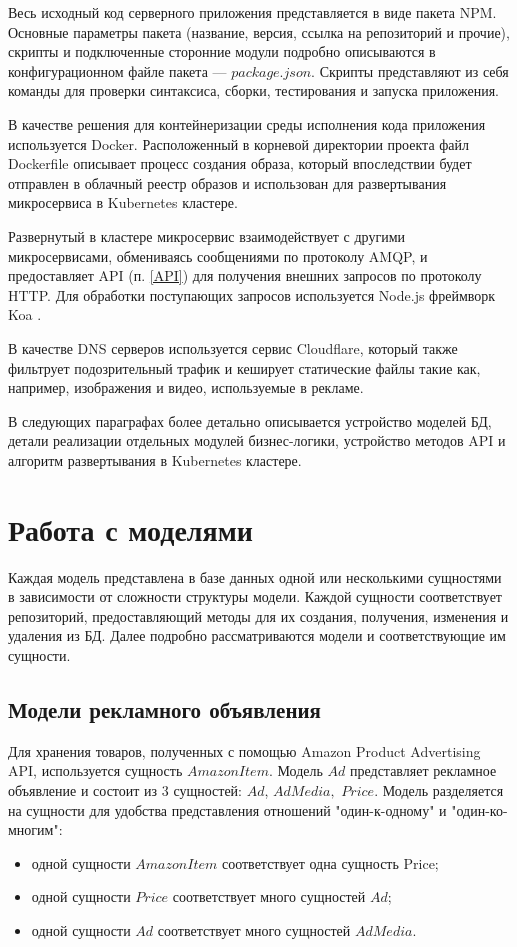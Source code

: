 \documentclass[specification,annotation,times]{itmo-student-thesis}
\begin{document}
Весь исходный код серверного приложения представляется в виде пакета NPM. Основные параметры пакета (название, версия, ссылка на репозиторий и прочие), скрипты и подключенные сторонние модули подробно описываются в конфигурационном файле пакета — $package.json$. Скрипты представляют из себя команды для проверки синтаксиса, сборки, тестирования и запуска приложения.

В качестве решения для контейнеризации среды исполнения кода приложения используется Docker. Расположенный в корневой директории проекта файл Dockerfile описывает процесс создания образа, который впоследствии будет отправлен в облачный реестр образов и использован для развертывания микросервиса в Kubernetes кластере.

Развернутый в кластере микросервис взаимодействует с другими микросервисами, обмениваясь сообщениями по протоколу AMQP, и предоставляет API (п. \ref{API}) для получения внешних запросов по протоколу HTTP. Для обработки поступающих запросов используется Node.js фреймворк Koa \cite{koa-js}.

В качестве DNS серверов используется сервис Cloudflare, который также фильтрует подозрительный трафик и кеширует статические файлы такие как, например, изображения и видео, используемые в рекламе.

В следующих параграфах более детально описывается устройство моделей БД, детали реализации отдельных модулей бизнес-логики, устройство методов API и алгоритм развертывания в Kubernetes кластере.




\section{Работа с моделями}

Каждая модель представлена в базе данных одной или несколькими сущностями в зависимости от сложности структуры модели. Каждой сущности соответствует репозиторий, предоставляющий методы для их создания, получения, изменения и удаления из БД. Далее подробно рассматриваются модели и соответствующие им сущности.

\subsection{Модели рекламного объявления}

Для хранения товаров, полученных с помощью Amazon Product Advertising API, используется сущность $AmazonItem$. Модель $Ad$ представляет рекламное объявление и состоит из 3 сущностей: $Ad$, $AdMedia, $  $Price$. Модель разделяется на сущности для удобства представления отношений "один-к-одному" и "один-ко-многим": 
\begin{itemize}
\item одной сущности $AmazonItem$ соответствует одна сущность Price;
\item одной сущности $Price$ соответствует много сущностей $Ad$;
\item одной сущности $Ad$ соответствует много сущностей $AdMedia$.
\end{itemize}
\end{document}

